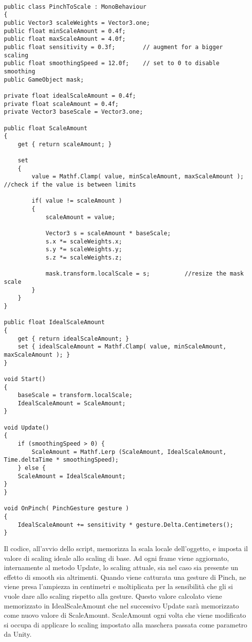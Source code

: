 \begin{lstlisting}

public class PinchToScale : MonoBehaviour
{
public Vector3 scaleWeights = Vector3.one;
public float minScaleAmount = 0.4f;
public float maxScaleAmount = 4.0f;
public float sensitivity = 0.3f;		// augment for a bigger scaling
public float smoothingSpeed = 12.0f;    // set to 0 to disable smoothing
public GameObject mask;

private float idealScaleAmount = 0.4f;
private float scaleAmount = 0.4f;
private Vector3 baseScale = Vector3.one;

public float ScaleAmount
{
	get { return scaleAmount; }
	
	set 
	{ 
		value = Mathf.Clamp( value, minScaleAmount, maxScaleAmount );	//check if the value is between limits
		
		if( value != scaleAmount )
		{
			scaleAmount = value;
			
			Vector3 s = scaleAmount * baseScale;
			s.x *= scaleWeights.x;
			s.y *= scaleWeights.y;
			s.z *= scaleWeights.z;
			
			mask.transform.localScale = s;			//resize the mask scale
		}
	}
}

public float IdealScaleAmount
{
	get { return idealScaleAmount; }
	set { idealScaleAmount = Mathf.Clamp( value, minScaleAmount, maxScaleAmount ); }
}

void Start()
{
	baseScale = transform.localScale;
	IdealScaleAmount = ScaleAmount;
}

void Update()
{
	if (smoothingSpeed > 0) {
		ScaleAmount = Mathf.Lerp (ScaleAmount, IdealScaleAmount, Time.deltaTime * smoothingSpeed);
	} else {
	ScaleAmount = IdealScaleAmount;
}
}

void OnPinch( PinchGesture gesture )
{  
	IdealScaleAmount += sensitivity * gesture.Delta.Centimeters();
} 
\end{lstlisting}

Il codice, all'avvio dello script, memorizza la scala locale dell'oggetto, e imposta il valore di scaling ideale allo scaling di base. Ad ogni frame viene aggiornato, internamente al metodo Update, lo scaling attuale, sia nel caso sia presente un effetto di smooth sia altrimenti. Quando viene catturata una gesture di Pinch, ne viene presa l'ampiezza in centimetri e moltiplicata per la sensibilit\`a che gli si vuole dare allo scaling rispetto alla gesture. Questo valore calcolato viene memorizzato in IdealScaleAmount che nel successivo Update sar\`a memorizzato come nuovo valore di ScaleAmount. ScaleAmount ogni volta che viene modificato si occupa di applicare lo scaling impostato alla maschera passata come parametro da Unity.\\\\


